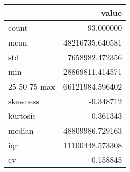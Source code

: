\begin{tabular}{lr}
\toprule
 & value \\
\midrule
count & 93.000000 \\
mean & 48216735.640581 \\
std & 7658982.472356 \\
min & 28869811.414571 \\
25%
50%
75%
max & 66121984.596402 \\
skewness & -0.348712 \\
kurtosis & -0.361343 \\
median & 48809986.729163 \\
iqr & 11100448.573308 \\
cv & 0.158845 \\
\bottomrule
\end{tabular}
